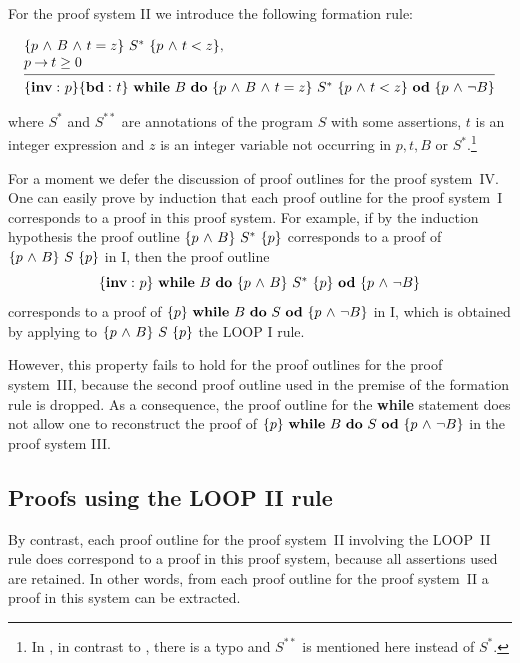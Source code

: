 \documentclass[manuscript, screen, review]{acmart}
\begin{document}
For the proof system II we introduce the following formation rule:
\III

\NI
\[
\begin{array}{l}
\HT{p \A B \A t=z}{S^{*}}{p \A t<z},                    \\
p \ra t \geq 0                                          \\
[-\medskipamount]
\hrulefill                                              \\
\Cu{{\bf inv:}\ p}
\HT{{\bf bd:}\ t}
   {\WDD{B}{\HT{p \A B \A t = z}{S^*}{p \A t<z}}}
   {p \A \neg B}
\end{array}
\]

\NI
where $S^*$ and $S^{**}$ are annotations of
the program $S$ with some assertions, 
$t$ is an integer expression and $z$ is an integer variable
not occurring in $p,t,B$ or $S^{*}$.\footnote{In \cite{ABO09}, in contrast to \cite{ABO90},
there is a typo and $S^{**}$ is mentioned here instead of $S^{*}$.}
\III


For a moment we defer the discussion of proof outlines for the proof
system~IV.  One can easily prove by induction that each proof outline
for the proof system~I corresponds to a proof in this proof
system. For example, if by the induction hypothesis the proof outline
$\mbox{$\{{p \mbox{$\ \wedge\ $} B}\}\ {S^*}\ \{{p}\}$}$ corresponds to a proof of $\mbox{$\{{p \mbox{$\ \wedge\ $} B}\}\ {S}\ \{{p}\}$}$ in
I, then the proof outline
\[
  \HT{{\bf inv:}\ p}{\WDD{B}{\HT{p \A B}{S^*}{p}}}{p \A \neg B}
\]
corresponds to a proof of $\mbox{$\{{p}\}\ {\mbox{$\mbox{{\bf while}\ } {B}\ \mbox{{\bf do}\ } {S}\ \mbox{{\bf od}}$}}\ \{{p \mbox{$\ \wedge\ $} \neg B}\}$}$ in I,
which is obtained by applying to $\mbox{$\{{p \mbox{$\ \wedge\ $} B}\}\ {S}\ \{{p}\}$}$ the LOOP I rule.

However, this property fails to hold for the proof outlines for the proof
system~III, because the second proof outline used in the premise of the
formation rule is dropped. As a consequence, the proof outline for the
\textbf{while} statement does not allow one to reconstruct the proof
of $\mbox{$\{{p}\}\ {\mbox{$\mbox{{\bf while}\ } {B}\ \mbox{{\bf do}\ } {S}\ \mbox{{\bf od}}$}}\ \{{p \mbox{$\ \wedge\ $} \neg B}\}$}$ in the proof system III.


\subsection{Proofs using the LOOP II rule}

By contrast, each proof outline for the proof system~II involving the LOOP~II rule
does correspond to a proof in this proof system, because all assertions
used are retained. In other words, from each proof outline for the
proof system~II a proof in this system can be extracted.  
\end{document}
